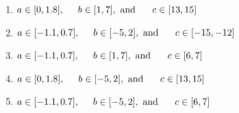 \documentclass[14pt]{extbook}
\begin{document}
\begin{enumerate}
{\begin{center}
\end{center}
\begin{enumerate}[label=\Alph*.]
\item \( a \in [0, 1.8], \hspace*{5mm} b \in [1, 7], \text{ and } \hspace*{5mm} c \in [13, 15] \)
\item \( a \in [-1.1, 0.7], \hspace*{5mm} b \in [-5, 2], \text{ and } \hspace*{5mm} c \in [-15, -12] \)
\item \( a \in [-1.1, 0.7], \hspace*{5mm} b \in [1, 7], \text{ and } \hspace*{5mm} c \in [6, 7] \)
\item \( a \in [0, 1.8], \hspace*{5mm} b \in [-5, 2], \text{ and } \hspace*{5mm} c \in [13, 15] \)
\item \( a \in [-1.1, 0.7], \hspace*{5mm} b \in [-5, 2], \text{ and } \hspace*{5mm} c \in [6, 7] \)


\end{enumerate}}
\end{enumerate}
\end{document}
